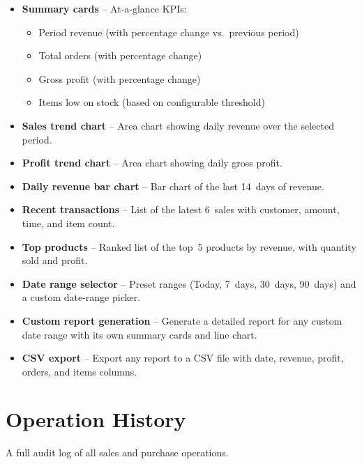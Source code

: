 \documentclass[12pt,a4paper]{article}
\begin{document}
\begin{itemize}[leftmargin=1.5em]
  \item \textbf{Summary cards} -- At-a-glance KPIs:
    \begin{itemize}
      \item Period revenue (with percentage change vs.\ previous period)
      \item Total orders (with percentage change)
      \item Gross profit (with percentage change)
      \item Items low on stock (based on configurable threshold)
    \end{itemize}
  \item \textbf{Sales trend chart} -- Area chart showing daily revenue over the
        selected period.
  \item \textbf{Profit trend chart} -- Area chart showing daily gross profit.
  \item \textbf{Daily revenue bar chart} -- Bar chart of the last 14~days of
        revenue.
  \item \textbf{Recent transactions} -- List of the latest 6~sales with
        customer, amount, time, and item count.
  \item \textbf{Top products} -- Ranked list of the top~5 products by revenue,
        with quantity sold and profit.
  \item \textbf{Date range selector} -- Preset ranges (Today, 7~days,
        30~days, 90~days) and a custom date-range picker.
  \item \textbf{Custom report generation} -- Generate a detailed report for
        any custom date range with its own summary cards and line chart.
  \item \textbf{CSV export} -- Export any report to a CSV file with date,
        revenue, profit, orders, and items columns.
\end{itemize}

\section{Operation History}

A full audit log of all sales and purchase operations.
\end{document}
